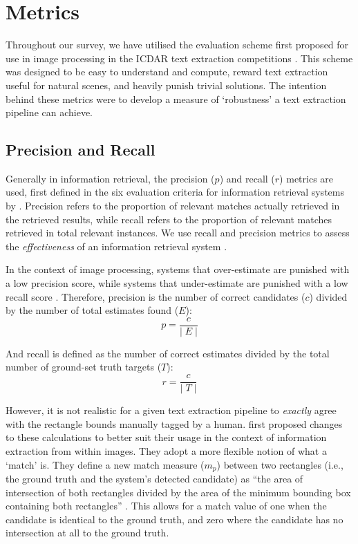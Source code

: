 \section{Metrics}
\label{sec:background:metrics}

Throughout our survey, we have utilised the evaluation scheme first proposed for use in image processing in the ICDAR text extraction competitions \citep{Lucas:2003iw, Lucas:2005bq, Shahab:2011hq}. This scheme was designed to be easy to understand and compute, reward text extraction useful for natural scenes, and heavily punish trivial solutions. The intention behind these metrics were to develop a measure of `robustness' a text extraction pipeline can achieve.

\subsection{Precision and Recall}
\label{sec:background:metrics:precision_and_recall}

Generally in information retrieval, the precision ($p$) and recall ($r$) metrics are used, first defined in the six evaluation criteria for information retrieval systems by \citet{Cleverdon:1966vd}. Precision refers to the proportion of relevant matches actually retrieved in the retrieved results, while recall refers to the proportion of relevant matches retrieved in total relevant instances. We use recall and precision metrics to assess the \textit{effectiveness} of an information retrieval system \citep{Rijsbergen:1979dw}.

In the context of image processing, systems that over-estimate are punished with a low precision score, while systems that under-estimate are punished with a low recall score \citep{Lucas:2003iw}. Therefore, precision is the number of correct candidates ($c$) divided by the number of total estimates found ($E$):
\begin{equation*}
  p = \frac{c}{\lvert\;E\;\rvert}
\end{equation*}

And recall is defined as the number of correct estimates divided by the total number of ground-set truth targets ($T$):
\begin{equation*}
  r = \frac{c}{\lvert\;T\;\rvert}
\end{equation*}

However, it is not realistic for a given text extraction pipeline to \textit{exactly} agree with the rectangle bounds manually tagged by a human. \citet{Lucas:2003iw} first proposed changes to these calculations to better suit their usage in the context of information extraction from within images. They adopt a more flexible notion of what a `match' is. They define a new match measure ($m_{p}$) between two rectangles (i.e., the ground truth and the system's detected candidate) as ``the area of intersection of both rectangles divided by the area of the minimum bounding box containing both rectangles'' \citep{Lucas:2003iw}. This allows for a match value of one when the candidate is identical to the ground truth, and zero where the candidate has no intersection at all to the ground truth.

